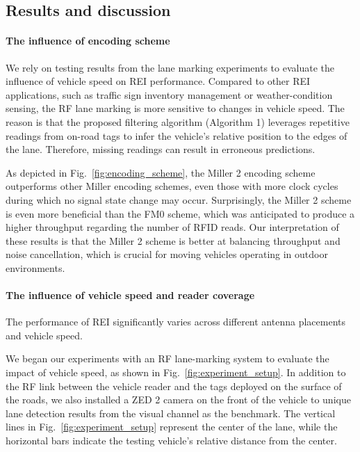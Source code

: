 \documentclass[lettersize,journal]{IEEEtran}
\begin{document}
\subsection{Results and discussion}

\paragraph{The influence of encoding scheme}
We rely on testing results from the lane marking experiments to evaluate the influence of vehicle speed on REI performance. Compared to other REI applications, such as traffic sign inventory management or weather-condition sensing, the RF lane marking is more sensitive to changes in vehicle speed. The reason is that the proposed filtering algorithm (Algorithm 1) leverages repetitive readings from on-road tags to infer the vehicle's relative position to the edges of the lane. Therefore, missing readings can result in erroneous predictions. 

As depicted in Fig.~\ref{fig:encoding_scheme}, the Miller 2 encoding scheme outperforms other Miller encoding schemes, even those with more clock cycles during which no signal state change may occur. Surprisingly, the Miller 2 scheme is even more beneficial than the FM0 scheme, which was anticipated to produce a higher throughput regarding the number of RFID reads. Our interpretation of these results is that the Miller 2 scheme is better at balancing throughput and noise cancellation, which is crucial for moving vehicles operating in outdoor environments.



\paragraph{The influence of vehicle speed and reader coverage}
The performance of REI significantly varies across different antenna placements and vehicle speed. 

We began our experiments with an RF lane-marking system to evaluate the impact of vehicle speed, as shown in Fig.~\ref{fig:experiment_setup}. In addition to the RF link between the vehicle reader and the tags deployed on the surface of the roads, we also installed a ZED 2 camera on the front of the vehicle to unique lane detection results from the visual channel as the benchmark. The vertical lines in Fig.~\ref{fig:experiment_setup} represent the center of the lane, while the horizontal bars indicate the testing vehicle's relative distance from the center.
\end{document}
